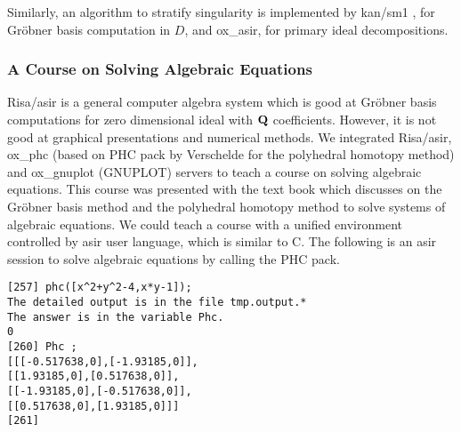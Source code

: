 Similarly, 
an algorithm to stratify singularity 
\cite{oaku-advance}
is implemented by
kan/sm1 \cite{kan}, for Gr\"obner basis computation in $D$, and
ox\_asir, for primary ideal decompositions.

\subsubsection{A Course on Solving Algebraic Equations}

Risa/asir \cite{asir} is a general computer algebra system
which is good at Gr\"obner basis computations for zero dimensional ideal
with ${\bf Q}$ coefficients.
However, it is not good at graphical presentations and
numerical methods.
We integrated Risa/asir, ox\_phc (based on PHC pack by Verschelde \cite{phc}
for the polyhedral homotopy method) and
ox\_gnuplot (GNUPLOT) servers
to teach a course on solving algebraic equations.
This course was presented with the text book \cite{CLO} which discusses
on the Gr\"obner basis method and the polyhedral homotopy method
to solve systems of algebraic equations.
We could teach a course
with a unified environment
controlled by asir user language, which is similar to C.
The following is an asir session to solve algebraic equations by calling
the PHC pack.
\begin{verbatim}
[257] phc([x^2+y^2-4,x*y-1]);
The detailed output is in the file tmp.output.*
The answer is in the variable Phc.
0
[260] Phc ;
[[[-0.517638,0],[-1.93185,0]],
[[1.93185,0],[0.517638,0]],
[[-1.93185,0],[-0.517638,0]],
[[0.517638,0],[1.93185,0]]]
[261] 
\end{verbatim}




